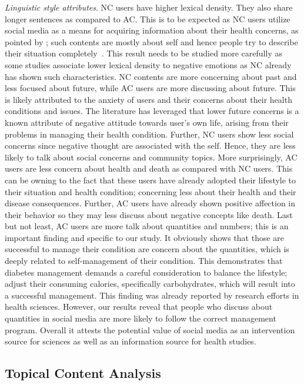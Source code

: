 \documentclass{acm_proc_article-sp}
\begin{document}
\emph{Linguistic style attributes}. NC users have higher lexical density. They also share longer sentences as compared to AC. This is to be expected as NC users utilize social media as a means for acquiring information about their health concerns, as pointed by \cite{de2014seeking,gray2005health}; such contents are mostly about self and hence people try to describe their situation completely~\cite{cao2011askhermes}. This result needs to be studied more carefully as some studies associate lower lexical density to negative emotions as NC already has shown such characteristics. NC contents are more concerning about past and less focused about future, while AC users are more discussing about future. This is likely attributed to the anxiety of users and their concerns about their health conditions and issues. The literature has leveraged that lower future concerns is a known attribute of negative attitude towards user's own life, arising from their problems in managing their health condition\cite{chapman2005vital}. Further, NC users show less social concerns since negative thought are associated with the self. Hence, they are less likely to talk about social concerns and community topics. More surprisingly, AC users are less concern about health and death as compared with NC users. This can be owning to the fact that these users have already adopted their lifestyle to their situation and health condition; concerning less about their health and their disease consequences. Further, AC users have already shown positive affection in their behavior so they may less discuss about negative concepts like death. Last but not least, AC users are more talk about quantities and numbers; this is an important finding and specific to our study. It obviously shows that those are successful to manage their condition are concern about the quantities, which is deeply related to self-management of their condition. This demonstrates that diabetes management demands a careful consideration to balance the lifestyle; adjust their consuming calories, specifically carbohydrates, which will result into a successful management. This finding was already reported by research efforts in health sciences. However, our results reveal that people who discuss about quantities in social media are more likely to follow the correct management program. Overall it attests the potential value of social media as an intervention source for sciences as well as an information source for health studies.


\subsection{Topical Content Analysis}
\label{sec::content-ngram-topic}
\end{document}
